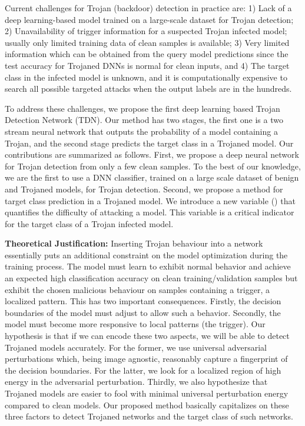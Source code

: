 \documentclass{article}
\begin{document}
Current challenges for Trojan (backdoor) detection in practice are: 1) Lack of a deep learning-based model trained on a large-scale dataset for Trojan detection; 2) Unavailability of trigger information for a suspected Trojan infected model; usually only limited training data of clean samples is available;  3) Very limited information which can be obtained from the query model predictions since the test accuracy for Trojaned DNNs is normal for clean inputs, and 4) The target class in the infected model is unknown, and it is computationally expensive to search all possible targeted attacks when the output labels are in the hundreds.



To address these challenges, we propose the first deep learning based Trojan Detection Network (TDN). Our method has two stages, the first one is a two stream neural network that outputs the probability of a model containing a Trojan, and the second stage predicts the target class in a Trojaned model. Our contributions are summarized as follows. First, we propose a deep neural network for Trojan detection from only a few clean samples. To the best of our knowledge, we are the first to use a DNN classifier, trained on a large scale dataset of benign and Trojaned models, for Trojan detection. Second, we propose a method for target class prediction in a Trojaned model. We introduce a new variable () that quantifies the difficulty of attacking a model. This variable is a critical indicator for the target class of a Trojan infected model.


{\bf Theoretical Justification:} Inserting Trojan behaviour into a network essentially puts an additional constraint on the model optimization during the training process. The model must learn to exhibit normal behavior and achieve an expected high classification accuracy on clean training/validation samples but exhibit the chosen malicious behaviour on samples containing a trigger, a localized pattern. This  has two important consequences. Firstly, the decision boundaries of the model must adjust to allow such a behavior. Secondly, the model must become more responsive to local patterns (the trigger). Our hypothesis is that if we can encode these two aspects, we will be able to detect Trojaned models accurately. For the former, we use universal adversarial perturbations \cite{moosavi2017universal} which, being image agnostic, reasonably capture a fingerprint of the decision boundaries. For the latter, we look for a localized region of high energy in the adversarial perturbation. Thirdly, we also hypothesize that Trojaned models are easier to fool with minimal universal perturbation energy compared to clean models. Our proposed method basically capitalizes on these three factors to detect Trojaned networks and the target class of such networks. 
\end{document}
